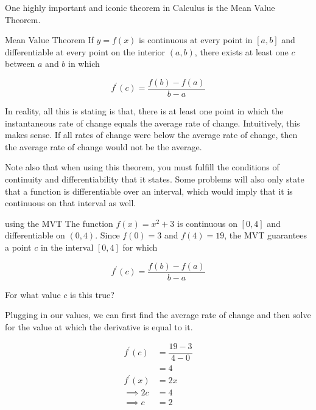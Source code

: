 One highly important and iconic theorem in Calculus is the Mean Value Theorem.

\begin{theorem}{Mean Value Theorem}
    If \( y = f \left( x \right) \) is continuous at every point in \( \left[a, b \right] \) and differentiable at every point on the interior \( \left(a, b \right) \), there exists at least one \( c \) between \( a \) and \( b \) in which
    
    \[ f^\prime \left( c \right) = \dfrac{f \left( b \right) - f \left( a \right)}{b - a} \]
\end{theorem}

In reality, all this is stating is that, there is at least one point in which the instantaneous rate of change equals the average rate of change. Intuitively, this makes sense. If all rates of change were below the average rate of change, then the average rate of change would not be the average.

Note also that when using this theorem, you must fulfill the conditions of continuity and differentiability that it states. Some problems will also only state that a function is differentiable over an interval, which would imply that it is continuous on that interval as well.

\begin{example}{using the MVT}
    The function \( f \left( x \right) = x^2 + 3 \) is continuous on \( \left[0, 4 \right] \) and differentiable on \( \left(0, 4 \right) \). Since \( f \left( 0 \right) = 3 \) and \( f \left( 4 \right) = 19 \), the MVT guarantees a point \( c \) in the interval \( \left[0, 4 \right] \) for which 
    
    \[ f^\prime \left( c \right) = \dfrac{f \left( b \right) - f \left( a \right)}{b - a} \]
    
    For what value \( c \) is this true?
    
    \vspace{0.3cm}
    
    Plugging in our values, we can first find the average rate of change and then solve for the value at which the derivative is equal to it.
    
    \begin{align}
        f^\prime \left( c \right) &= \dfrac{19 - 3}{4 - 0} \\
        &= 4 \\
        f^\prime \left( x \right) &= 2x \\
        \implies 2c &= 4 \\
        \implies c &= 2
    \end{align}
\end{example}

